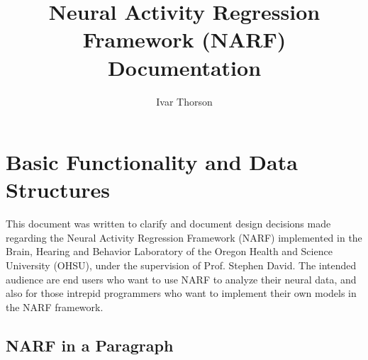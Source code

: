 \documentclass[letterpaper]{report}
\title{Neural Activity Regression Framework (NARF) Documentation}
\author{Ivar Thorson}
\begin{document}
\maketitle
\tableofcontents

\chapter{Basic Functionality and Data Structures}

This document was written to clarify and document design decisions made regarding the Neural Activity Regression Framework (NARF) implemented in the Brain, Hearing and Behavior Laboratory of the Oregon Health and Science University (OHSU), under the supervision of Prof. Stephen David. The intended audience are end users who want to use NARF to analyze their neural data, and also for those intrepid programmers who want to implement their own models in the NARF framework. 

\section{NARF in a Paragraph} 
\end{document}
